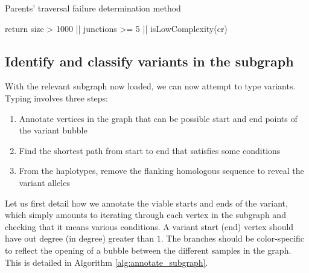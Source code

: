 \begin{algorithm}
\caption{Parents' traversal failure determination method}
\label{alg:parent_hasTraversalFailed}
\begin{algorithmic}[1]
    \State return size > 1000 || junctions >= 5 || isLowComplexity(cr)
\EndFunction
\end{algorithmic}
\end{algorithm}

\subsection{Identify and classify variants in the subgraph}

With the relevant subgraph now loaded, we can now attempt to type variants.  Typing involves three steps:

\begin{enumerate}
\item Annotate vertices in the graph that can be possible start and end points of the variant bubble
\item Find the shortest path from start to end that satisfies some conditions
\item From the haplotypes, remove the flanking homologous sequence to reveal the variant alleles
\end{enumerate}

Let us first detail how we annotate the viable starts and ends of the variant, which simply amounts to iterating through each vertex in the subgraph and checking that it means various conditions.  A variant start (end) vertex should have out degree (in degree) greater than $1$.  The branches should be color-specific to reflect the opening of a bubble between the different samples in the graph.  This is detailed in Algorithm \ref{alg:annotate_subgraph}.

